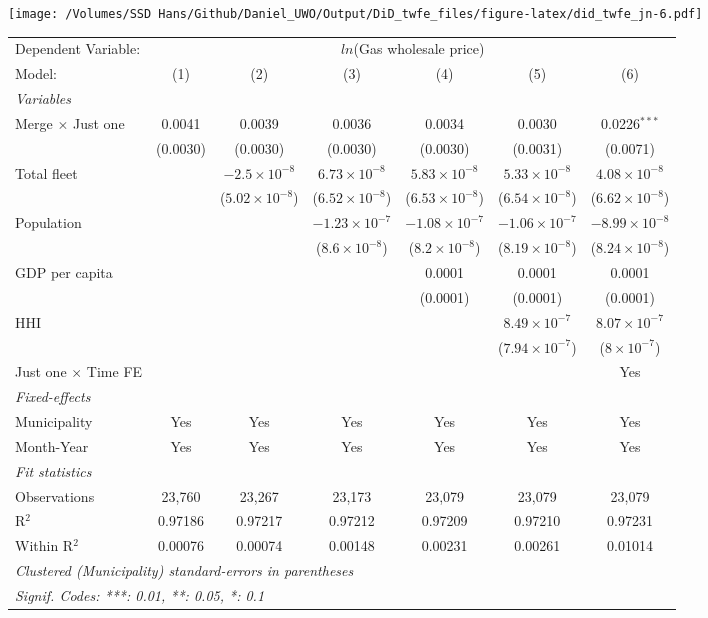 \documentclass[
]{article}
\begin{document}
\texttt{[image: /Volumes/SSD Hans/Github/Daniel\_UWO/Output/DiD\_twfe\_files/figure-latex/did\_twfe\_jn-6.pdf]}

\begin{tabular}{lcccccc}
\tabularnewline\midrule\midrule
Dependent Variable:&\multicolumn{6}{c}{$ln$(Gas wholesale price)}\\
Model:&(1) & (2) & (3) & (4) & (5) & (6)\\
\midrule \emph{Variables}&   &   &   &   &   &  \\
Merge $\times $ Just one & 0.0041 & 0.0039 & 0.0036 & 0.0034 & 0.0030 & 0.0226$^{***}$\\
  &(0.0030) & (0.0030) & (0.0030) & (0.0030) & (0.0031) & (0.0071)\\
Total fleet &    & $-2.5\times 10^{-8}$ & $6.73\times 10^{-8}$ & $5.83\times 10^{-8}$ & $5.33\times 10^{-8}$ & $4.08\times 10^{-8}$\\
  &   & ($5.02\times 10^{-8}$) & ($6.52\times 10^{-8}$) & ($6.53\times 10^{-8}$) & ($6.54\times 10^{-8}$) & ($6.62\times 10^{-8}$)\\
Population &    &    & $-1.23\times 10^{-7}$ & $-1.08\times 10^{-7}$ & $-1.06\times 10^{-7}$ & $-8.99\times 10^{-8}$\\
  &   &    & ($8.6\times 10^{-8}$) & ($8.2\times 10^{-8}$) & ($8.19\times 10^{-8}$) & ($8.24\times 10^{-8}$)\\
GDP per capita &    &    &    & 0.0001 & 0.0001 & 0.0001\\
  &   &    &    & (0.0001) & (0.0001) & (0.0001)\\
HHI &    &    &    &    & $8.49\times 10^{-7}$ & $8.07\times 10^{-7}$\\
  &   &    &    &    & ($7.94\times 10^{-7}$) & ($8\times 10^{-7}$)\\
Just one $\times$ Time FE &  &  &  &  &  & Yes\\
\midrule \emph{Fixed-effects}&   &   &   &   &   &  \\
Municipality & Yes & Yes & Yes & Yes & Yes & Yes\\
Month-Year & Yes & Yes & Yes & Yes & Yes & Yes\\
\midrule \emph{Fit statistics}&  & & & & & \\
Observations & 23,760&23,267&23,173&23,079&23,079&23,079\\
R$^2$ & 0.97186&0.97217&0.97212&0.97209&0.97210&0.97231\\
Within R$^2$ & 0.00076&0.00074&0.00148&0.00231&0.00261&0.01014\\
\midrule\midrule\multicolumn{7}{l}{\emph{Clustered (Municipality) standard-errors in parentheses}}\\
\multicolumn{7}{l}{\emph{Signif. Codes: ***: 0.01, **: 0.05, *: 0.1}}\\
\end{tabular}
\end{document}
